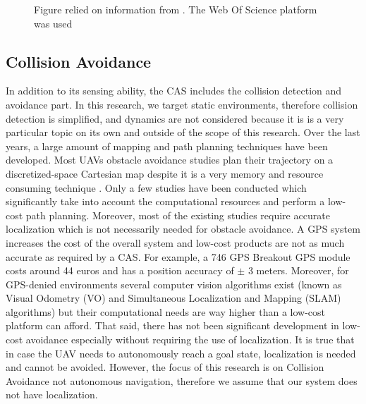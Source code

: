 \begin{figure}[]
  \caption{Figure relied on information from \cite{Sanchez-Rodriguez2018a}. The Web Of Science platform was used \cite{web_of_science}}
  \label{stereo_vision_publications}
\end{figure}


\subsection*{Collision Avoidance}

In addition to its sensing ability, the \ac{CAS} includes the collision detection and avoidance part. In this research, we target static environments, therefore collision detection is simplified, and dynamics are not considered because it is is a very particular topic on its own and outside of the scope of this research. Over the last years, a large amount of mapping and path planning techniques have been developed. Most \acp{UAV} obstacle avoidance studies plan their trajectory on a discretized-space Cartesian map despite it is a very memory and resource consuming technique \cite{Brockers2016b}. Only a few studies have been conducted which significantly take into account the computational resources and perform a low-cost path planning. Moreover, most of the existing studies require accurate localization which is not necessarily needed for obstacle avoidance. A GPS system increases the cost of the overall system and low-cost products are not as much accurate as required by a \ac{CAS}. For example, a 746 GPS Breakout GPS module costs around 44 euros and has a position accuracy of $\pm$ 3 meters. Moreover, for GPS-denied environments several computer vision algorithms exist (known as Visual Odometry (VO) and Simultaneous Localization and Mapping (SLAM) algorithms) but their computational needs are way higher than a low-cost platform can afford. That said, there has not been significant development in low-cost avoidance especially without requiring the use of localization. It is true that in case the \ac{UAV} needs to autonomously reach a goal state, localization is needed and cannot be avoided. However, the focus of this research is on Collision Avoidance not autonomous navigation, therefore we assume that our system does not have localization.

